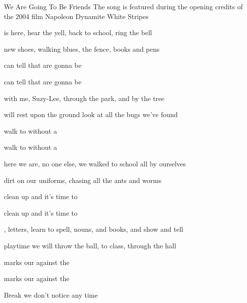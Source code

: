 \begin{SBSong}{We Are Going To Be Friends}
  {The song is featured during the opening credits of the 2004 film Napoleon Dynamite}
  {White Stripes}
  \begin{SBVerse}
     is here, hear the yell, back to school, ring the bell
    
     new shoes, walking blues,  the fence, books and pens
    
     can tell that  are gonna be 
    
     can tell that  are gonna be 
  \end{SBVerse}
  
  \begin{SBVerse}
     with me, Suzy-Lee, through the park, and by the tree
    
     will rest upon the ground  look at all the bugs we've found
    
     walk to  without a 
    
     walk to  without a 
  \end{SBVerse}
  \begin{SBVerse}
     here we are, no one else, we walked to school all by ourselves
    
     dirt on our uniforms,  chasing all the ants and worms
    
     clean up and  it's time to 
    
     clean up and  it's time to 
  \end{SBVerse}
  \begin{SBVerse}
    , letters, learn to spell, nouns, and books, and show and tell
    
     playtime we will throw the ball,  to class, through the hall
    
     marks our  against the 
    
     marks our  against the 
  \end{SBVerse}
  \begin{SBBracket}{Break}
     we don't notice any time 
    

\end{SBBracket}
\end{SBSong}
